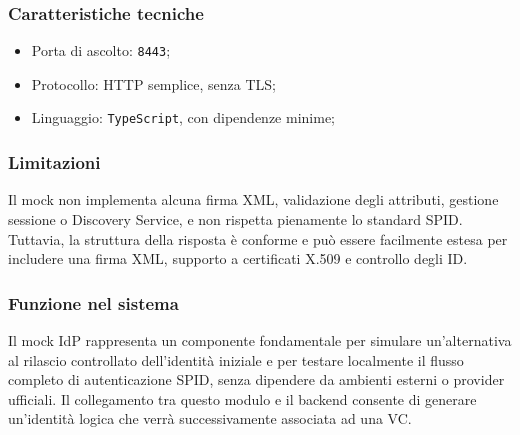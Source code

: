             \subsubsection{Caratteristiche tecniche}
                \begin{itemize}
                    \item Porta di ascolto: \texttt{8443};
                    
                    \item Protocollo: HTTP semplice, senza TLS;
                    
                    \item Linguaggio: \texttt{TypeScript}, con dipendenze minime;
                \end{itemize}
            
            \subsubsection{Limitazioni}
                \noindent Il mock non implementa alcuna firma XML, validazione degli attributi, gestione sessione o Discovery Service, e non rispetta pienamente lo standard SPID. Tuttavia, la struttura della risposta è conforme e può essere facilmente estesa per includere una firma XML, supporto a certificati X.509 e controllo degli ID.
            
            \subsubsection{Funzione nel sistema}
                \noindent Il mock IdP rappresenta un componente fondamentale per simulare un'alternativa al rilascio controllato dell'identità iniziale e per testare localmente il flusso completo di autenticazione SPID, senza dipendere da ambienti esterni o provider ufficiali. Il collegamento tra questo modulo e il backend consente di generare un'identità logica che verrà successivamente associata ad una VC.
            
